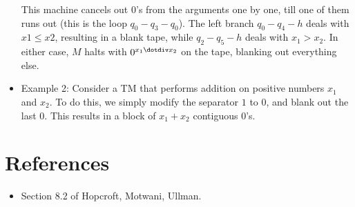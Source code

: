 \documentclass{article}
\begin{document}
\begin{sloppypar}
\begin{itemize}
        This machine cancels out $0$'s from the arguments one by one, till one of them runs out (this is the loop $q_0-q_3-q_0$). The left branch $q_0-q_4-h$ deals with $x1\le x2$, resulting in a blank tape, while $q_2-q_5-h$ deals with $x_1>x_2$. In either case, $M$ halts with $0^{x_1\dotdiv x_2}$ on the tape, blanking out everything else.

        \item Example 2: Consider a TM that performs addition on positive numbers $x_1$ and $x_2$. To do this, we simply modify the separator $1$ to $0$, and blank out the last $0$. This results in a block of $x_1+x_2$ contiguous $0$'s.
        
        \begin{minipage}{\linewidth}

            \centering


            \label{fig:4}

        \end{minipage}

        
    \end{itemize}


    \section{References}
    \begin{itemize}
        \item Section 8.2 of Hopcroft, Motwani, Ullman.
    \end{itemize}

\end{sloppypar}
\end{document}
